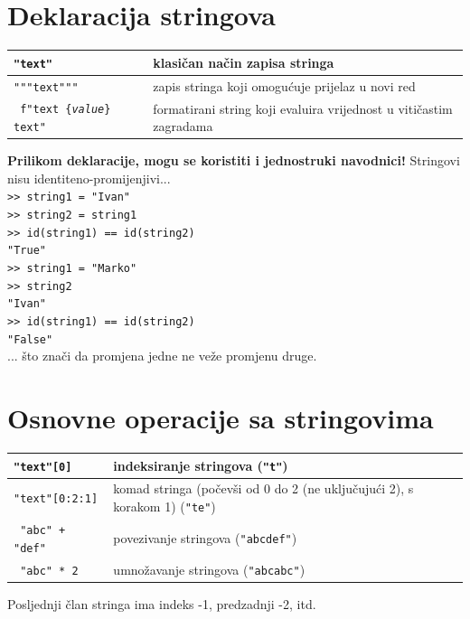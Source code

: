 \documentclass[10pt]{article}
\begin{document}
    \section*{\color{NavyBlue} Deklaracija stringova}
    \begin{tabular}{|>{\tt}p{9.00cm}|>{}p{15.50cm}|}
        \hline
        "text"                                  & klasičan način zapisa stringa                                            \\ \hline
        """text"""                              & zapis stringa koji omogućuje prijelaz u novi red                         \\ \hline
        f"text \{\textit{value}\} text"         & formatirani string koji evaluira vrijednost u vitičastim zagradama       \\ \hline
    \end{tabular}
    \begin{center}
        \footnotesize
        \textbf{Prilikom deklaracije, mogu se koristiti i jednostruki navodnici!}
        Stringovi nisu identiteno-promijenjivi... \\
        \texttt{>> string1 = "Ivan"} \\
        \texttt{>> string2 = string1} \\
        \texttt{>> id(string1) == id(string2)} \\
        \texttt{"True"} \\
        \texttt{>> string1 = "Marko"} \\
        \texttt{>> string2} \\
        \texttt{"Ivan"} \\
        \texttt{>> id(string1) == id(string2)} \\
        \texttt{"False"} \\
        ... što znači da promjena jedne ne veže promjenu druge.
    \end{center}
    
    \section*{\color{NavyBlue} Osnovne operacije sa stringovima}
    \begin{tabular}{|>{\tt}p{9.00cm}|>{}p{15.50cm}|}
        \hline
        "text"[0] & indeksiranje stringova (\texttt{"t"})
        \\ \hline
        "text"[0:2:1] & komad stringa (počevši od 0 do 2 (ne uključujući 2), s korakom 1) (\texttt{"te"})
        \\ \hline
        "abc" + "def" & povezivanje stringova (\texttt{"abcdef"})
        \\ \hline
        "abc" * 2 & umnožavanje stringova (\texttt{"abcabc"})
        \\ \hline
    \end{tabular}
    \begin{center}
        \footnotesize
        Posljednji član stringa ima indeks -1, predzadnji -2, itd.
    \end{center}
    
\end{document}
